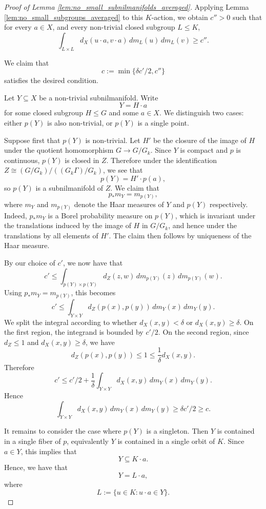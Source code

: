 \documentclass[12pt]{amsart}
\theoremstyle{plain}
\theoremstyle{definition}
\begin{document}
\begin{proof}[Proof of Lemma \ref{lem:no_small_subnilmanifolds_averaged}]
    Applying Lemma \ref{lem:no_small_subgroups_averaged} to this $K$-action, we obtain $c'' > 0$ such that for every $a \in X$, and every non-trivial closed subgroup $L \leq K$, 
    \[
    \int_{L \times L} d_X(u \cdot a, v \cdot a) \,d m_L(u) \,d m_L(v) \geq c''.
    \]

    We claim that 
    \[
    c := \min\{\delta c'/2, c''\} 
    \]
    satisfies the desired condition.

    Let $Y \subseteq X$ be a non-trivial subnilmanifold.
    Write 
    \[
    Y = H \cdot a
    \]
    for some closed subgroup $H \leq G$ and some $a \in X$.
    We distinguish two cases: either $p(Y)$ is also non-trivial, or $p(Y)$ is a single point.
    
    Suppose first that $p(Y)$ is non-trivial.  
    Let $H'$ be the closure of the image of $H$ under the quotient homomorphism $G \to G/G_k$.
    Since $Y$ is compact and $p$ is continuous, $p(Y)$ is closed in $Z$.
    Therefore under the identification $Z \cong (G/G_k)/((G_k\Gamma)/G_k)$, we see that 
    \[
    p(Y) = H' \cdot p(a),
    \]
    so $p(Y)$ is a subnilmanifold of $Z$.
    We claim that 
    \[
    p_* m_Y = m_{p(Y)},
    \]
    where $m_Y$ and $m_{p(Y)}$ denote the Haar measures of $Y$ and $p(Y)$ respectively. 
    Indeed, $p_* m_Y$ is a Borel probability measure on $p(Y)$, which is invariant under the translations induced by the image of $H$ in $G/G_k$, and hence under the translations by all elements of $H'$.
    The claim then follows by uniqueness of the Haar measure. 

    By our choice of $c'$, we now have that 
    \[
    c' \leq \int_{p(Y) \times p(Y)} d_Z(z,w) \,d m_{p(Y)}(z) \,d m_{p(Y)}(w). 
    \]
    Using $p_* m_Y = m_{p(Y)}$, this becomes 
    \[
    c' \leq \int_{Y \times Y} d_Z(p(x),p(y)) \,d m_Y(x) \,d m_Y(y).
    \]
    We split the integral according to whether $d_X(x,y) < \delta$ or $d_X(x,y) \geq \delta$.
    On the first region, the integrand is bounded by $c'/2$.
    On the second region, since $d_Z \leq 1$ and $d_X(x,y) \geq \delta$, we have 
    \[
    d_Z(p(x), p(y)) \leq 1 \leq \frac{1}{\delta} d_X(x,y).
    \]
    Therefore 
    \[
    c' \leq c'/2 + \frac{1}{\delta} \int_{Y \times Y} d_X(x,y) \,d m_Y(x) \,d m_Y(y).
    \]
    Hence 
    \[
    \int_{Y \times Y} d_X(x,y) \,d m_Y(x) \,d m_Y(y) \geq \delta c'/2 \geq c.
    \]

    It remains to consider the case where $p(Y)$ is a singleton.
    Then $Y$ is contained in a single fiber of $p$, equivalently $Y$ is contained in a single orbit of $K$.
    Since $a \in Y$, this implies that 
    \[
    Y \subseteq K \cdot a.
    \]
    Hence, we have that 
    \[
    Y = L \cdot a,
    \]
    where 
    \[
    L := \{u \in K : u \cdot a \in Y\}.
    \]


\end{proof}
\end{document}
